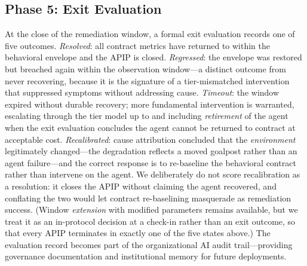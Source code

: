\subsection{Phase 5: Exit Evaluation}
\label{subsec:exit}

At the close of the remediation window, a formal exit evaluation records one
of five outcomes. \emph{Resolved}: all contract metrics have returned to
within the behavioral envelope and the APIP is closed. \emph{Regressed}: the
envelope was restored but breached again within the observation window---a
distinct outcome from never recovering, because it is the signature of a
tier-mismatched intervention that suppressed symptoms without addressing
cause. \emph{Timeout}: the window expired without durable recovery; more
fundamental intervention is warranted, escalating through the tier model up to
and including \emph{retirement} of the agent when the exit evaluation
concludes the agent cannot be returned to contract at acceptable cost.
\emph{Recalibrated}: cause attribution concluded that the \emph{environment}
legitimately changed---the degradation reflects a moved goalpost rather than
an agent failure---and the correct response is to re-baseline the behavioral
contract rather than intervene on the agent. We deliberately do not score
recalibration as a resolution: it closes the APIP without claiming the agent
recovered, and conflating the two would let contract re-baselining masquerade
as remediation success. (Window \emph{extension} with modified parameters
remains available, but we treat it as an in-protocol decision at a check-in
rather than an exit outcome, so that every APIP terminates in exactly one of
the five states above.) The evaluation record becomes part of the
organizational AI audit trail---providing governance documentation and
institutional memory for future deployments.
